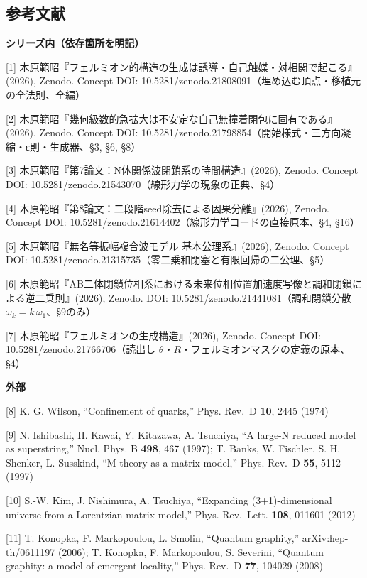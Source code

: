 \documentclass[
  a4paper,
]{ltjsarticle}
\begin{document}
\subsection{参考文献}\label{ux53c2ux8003ux6587ux732e}

\textbf{シリーズ内（依存箇所を明記）}

{[}1{]}
木原範昭『フェルミオン的構造の生成は誘導・自己触媒・対相関で起こる』(2026),
Zenodo. Concept DOI:
10.5281/zenodo.21808091（埋め込む頂点・移植元の全法則、全編）

{[}2{]}
木原範昭『幾何級数的急拡大は不安定な自己無撞着閉包に固有である』(2026),
Zenodo. Concept DOI:
10.5281/zenodo.21798854（開始様式・三方向凝縮・ε則・生成器、§3, §6, §8）

{[}3{]} 木原範昭『第7論文：N体関係波閉鎖系の時間構造』(2026), Zenodo.
Concept DOI: 10.5281/zenodo.21543070（線形力学の現象の正典、§4）

{[}4{]} 木原範昭『第8論文：二段階seed除去による因果分離』(2026), Zenodo.
Concept DOI: 10.5281/zenodo.21614402（線形力学コードの直接原本、§4,
§16）

{[}5{]} 木原範昭『無名等振幅複合波モデル 基本公理系』(2026), Zenodo.
Concept DOI:
10.5281/zenodo.21315735（零二乗和閉塞と有限回帰の二公理、§5）

{[}6{]}
木原範昭『AB二体閉鎖位相系における未来位相位置加速度写像と調和閉鎖による逆二乗則』(2026),
Zenodo. DOI: 10.5281/zenodo.21441081（調和閉鎖分散
\(\omega_k=k\,\omega_1\)、§9のみ）

{[}7{]} 木原範昭『フェルミオンの生成構造』(2026), Zenodo. Concept DOI:
10.5281/zenodo.21766706（読出し
\(\theta\)・\(R\)・フェルミオンマスクの定義の原本、§4）

\textbf{外部}

{[}8{]} K. G. Wilson, ``Confinement of quarks,'' Phys. Rev.~D
\textbf{10}, 2445 (1974)

{[}9{]} N. Ishibashi, H. Kawai, Y. Kitazawa, A. Tsuchiya, ``A large-N
reduced model as superstring,'' Nucl. Phys. B \textbf{498}, 467 (1997);
T. Banks, W. Fischler, S. H. Shenker, L. Susskind, ``M theory as a
matrix model,'' Phys. Rev.~D \textbf{55}, 5112 (1997)

{[}10{]} S.-W. Kim, J. Nishimura, A. Tsuchiya, ``Expanding
(3+1)-dimensional universe from a Lorentzian matrix model,'' Phys.
Rev.~Lett. \textbf{108}, 011601 (2012)

{[}11{]} T. Konopka, F. Markopoulou, L. Smolin, ``Quantum graphity,''
arXiv:hep-th/0611197 (2006); T. Konopka, F. Markopoulou, S. Severini,
``Quantum graphity: a model of emergent locality,'' Phys. Rev.~D
\textbf{77}, 104029 (2008)
\end{document}
